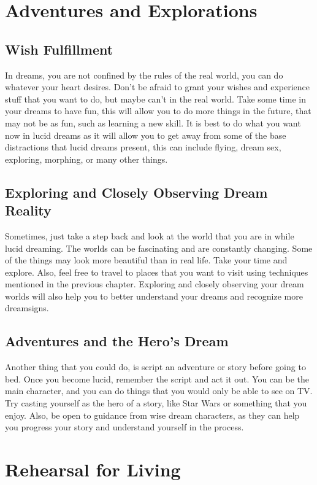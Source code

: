 \documentclass{report}
\begin{document}
\chapter{Adventures and Explorations}

\section{Wish Fulfillment}
In dreams, you are not confined by the rules of the real world, you can do whatever your heart desires. Don't be afraid to grant your wishes and experience stuff that you want to do, but maybe can't in the real world. Take some time in your dreams to have fun, this will allow you to do more things in the future, that may not be as fun, such as learning a new skill. It is best to do what you want now in lucid dreams as it will allow you to get away from some of the base distractions that lucid dreams present, this can include flying, dream sex, exploring, morphing, or many other things.

\section{Exploring and Closely Observing Dream Reality}
Sometimes, just take a step back and look at the world that you are in while lucid dreaming. The worlds can be fascinating and are constantly changing. Some of the things may look more beautiful than in real life. Take your time and explore. Also, feel free to travel to places that you want to visit using techniques mentioned in the previous chapter. Exploring and closely observing your dream worlds will also help you to better understand your dreams and recognize more dreamsigns. 

\section{Adventures and the Hero's Dream}
Another thing that you could do, is script an adventure or story before going to bed. Once you become lucid, remember the script and act it out. You can be the main character, and you can do things that you would only be able to see on TV. Try casting yourself as the hero of a story, like Star Wars or something that you enjoy. Also, be open to guidance from wise dream characters, as they can help you progress your story and understand yourself in the process.

\chapter{Rehearsal for Living}
\end{document}
